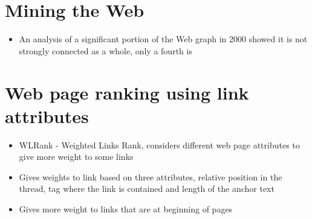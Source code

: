 \documentclass[11pt]{report}
\begin{document}
\section{Mining the Web}
\begin{itemize}
\item An analysis of a significant portion of the Web graph in 2000 showed it is not strongly connected as a whole, only a fourth is
\end{itemize}
\section{Web page ranking using link attributes}
\begin{itemize}
\item WLRank - Weighted Links Rank, considers different web page attributes to give more weight to some links
\item Gives weights to link based on three attributes, relative position in the thread, tag where the link is contained and length of the anchor text
\item Gives more weight to links that are at beginning of pages
\end{itemize}
\end{document}

